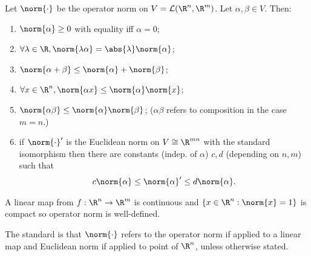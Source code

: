 \begin{proposition} \label{prp:2.2}
    Let $\norm{\cdot}$ be the operator norm on $V = \mathcal{L}(\R^n,\R^m)$. Let $\alpha,\beta\in V$. Then:
    \begin{enumerate}
        \item $\norm{\alpha}\ge 0$ with equality iff $\alpha = 0$;
        \item $\forall \lambda\in \R, \norm{\lambda \alpha} = \abs{\lambda}\norm{ \alpha}$;
        \item $\norm{\alpha + \beta} \leq \norm{\alpha} + \norm{\beta}$;
        \item $\forall x\in \R^n, \norm{\alpha x} \leq \norm{\alpha}\norm{x}$;
        \item $\norm{\alpha\beta} \leq \norm{\alpha}\norm{\beta}$; ($\alpha\beta$ refers to composition in the case $m=n$.)
        \item if $\norm{\cdot}'$ is the Euclidean norm on $V\cong \R^{mn}$ with the standard isomorphism then there are constants (indep. of $\alpha$) $c,d$ (depending on $n,m$) such that \begin{align*}
            c\norm{\alpha} \leq \norm{\alpha}' \leq d\norm{\alpha}.
        \end{align*} 
    \end{enumerate}
\end{proposition}

\begin{remark}
    A linear map from $f:\R^n\to \R^m$ is continuous and $\Set{x\in \R^n}{\norm{x} = 1}$ is compact so operator norm is well-defined.
\end{remark}

\begin{notation}
    The standard is that $\norm{\cdot}$ refers to the operator norm if applied to a linear map and Euclidean norm if applied to point of $\R^n$, unless otherwise stated.
\end{notation} 

